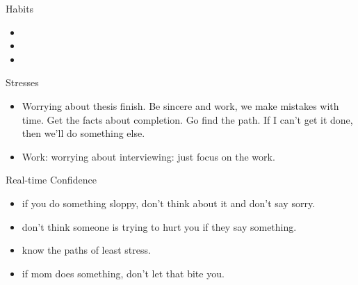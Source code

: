 \documentclass[serif, mathserif, final]{beamer}
\begin{document}
\begin{frame}{} 
  \begin{columns}
    \begin{column}{0.25\linewidth} %

      \begin{block}{Habits}
        \begin{itemize}
          \tiny \item \tiny 
        \item \tiny 
        \item \tiny 
        \end{itemize}
        
      \end{block}
      
      \begin{block}{Stresses}
        \begin{itemize}
          \tiny \item \tiny Worrying about thesis finish. Be sincere and work, we
          make mistakes with time. Get the facts about completion. Go
          find the path. If I can't get it done, then we'll do
          something else. 
          \tiny \item \tiny Work: worrying about interviewing: just
          focus on the work. 
        \end{itemize} 
      \end{block} 
      
     \begin{block}{Real-time Confidence}
     \begin{itemize}
       \tiny \item \tiny if you do something sloppy, don't
       think about it and don't say sorry.
     \item \tiny don't think someone is trying to hurt you if
       they say something.
     \item \tiny know the paths of least stress.
     \item \tiny if mom does something, don't let that bite
       you.
     \end{itemize}
     \end{block}
     

\end{column}
\end{columns}
\end{frame}
\end{document}
